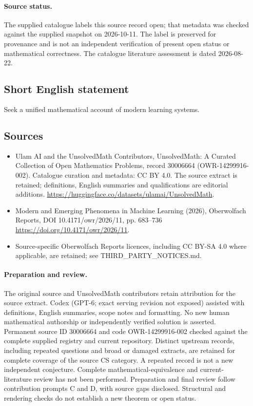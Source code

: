 \documentclass[11pt]{article}
\begin{document}
\paragraph{Source status.}
The supplied catalogue labels this source record open; that metadata was checked against the supplied snapshot on 2026-10-11. The label is preserved for provenance and is not an independent verification of present open status or mathematical correctness. The catalogue literature assessment is dated 2026-08-22.
\subsection{Short English statement}
Seek a unified mathematical account of modern learning systems.
\subsection{Sources}
\begin{itemize}
\item[S1] Ulam AI and the UnsolvedMath Contributors, UnsolvedMath: A Curated Collection of Open Mathematics Problems, record 30006664 (OWR-14299916-002). Catalogue curation and metadata: CC BY 4.0. The source extract is retained; definitions, English summaries and qualifications are editorial additions.
\url{https://huggingface.co/datasets/ulamai/UnsolvedMath}.
\item[S2] Modern and Emerging Phenomena in Machine Learning (2026), Oberwolfach Reports, DOI 10.4171/owr/2026/11, pp. 683--736
\url{https://doi.org/10.4171/owr/2026/11}.
\item Source-specific Oberwolfach Reports licences, including CC BY-SA 4.0 where applicable, are retained; see THIRD\_PARTY\_NOTICES.md.
\end{itemize}
\paragraph{Preparation and review.}
The original source and UnsolvedMath contributors retain attribution for the source extract. Codex (GPT-6; exact serving revision not exposed) assisted with definitions, English summaries, scope notes and formatting. No new human mathematical authorship or independently verified solution is asserted. Permanent source ID 30006664 and code OWR-14299916-002 checked against the complete supplied registry and current repository. Distinct upstream records, including repeated questions and broad or damaged extracts, are retained for complete coverage of the source CS category. A repeated record is not a new independent conjecture. Complete mathematical-equivalence and current-literature review has not been performed. Preparation and final review follow contribution prompts C and D, with source gaps disclosed. Structural and rendering checks do not establish a new theorem or open status.
\label{end:30006664}
\end{document}
